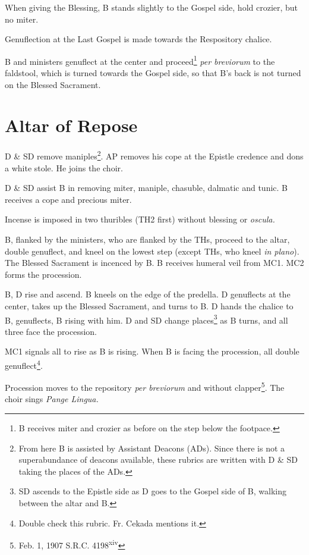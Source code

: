 \documentclass{report}
\begin{document}
\begin{multicols}{2}
    \rubric When giving the Blessing, B stands slightly to the Gospel side,
    hold crozier, but no miter.

    \rubric Genuflection at the Last Gospel is made towards the Respository
    chalice.

    \rubric B and ministers genuflect at the center and proceed\footnote{B
    receives miter and crozier as before on the step below the footpace.}
    \textit{per breviorum} to the faldstool, which is turned towards the Gospel
    side, so that B's back is not turned on the Blessed Sacrament.

    \section{Altar of Repose}

    \rubric D \& SD remove maniples\footnote{From here B is assisted by
    Assistant Deacons (ADs). Since there is not a superabundance of deacons
    available, these rubrics are written with D \& SD taking the places of the
    ADs.}. AP removes his cope at the Epistle credence and dons a white stole.
    He joins the choir.

    \rubric D \& SD assist B in removing miter, maniple, chasuble, dalmatic and
    tunic. B receives a cope and precious miter.

    \rubric Incense is imposed in two thuribles (TH2 first) without blessing or
    \textit{oscula.}

    \rubric B, flanked by the ministers, who are flanked by the THs, proceed to
    the altar, double genuflect, and kneel on the lowest step (except THs, who
    kneel \textit{in plano}). The Blessed Sacrament is incenced by B. B
    receives humeral veil from MC1. MC2 forms the procession.

    \rubric B, D rise and ascend. B kneels on the edge of the predella. D
    genuflects at the center, takes up the Blessed Sacrament, and turns to B. D
    hands the chalice to B, genuflects, B rising with him. D and SD change
    places\footnote{SD ascends to the Epistle side as D goes to the Gospel side
    of B, walking between the altar and B.} as B turns, and all three face the
    procession.

    \rubric MC1 signals all to rise as B is rising. When B is facing the
    procession, all double genuflect\footnote{Double check this rubric. Fr.
    Cekada mentions it.}.

    \rubric Procession moves to the repository \textit{per breviorum} and
    without clapper\footnote{Feb. 1, 1907 S.R.C. 4198\textsuperscript{xiv}}.
    The choir sings \textit{Pange Lingua.}


\end{multicols}
\end{document}
